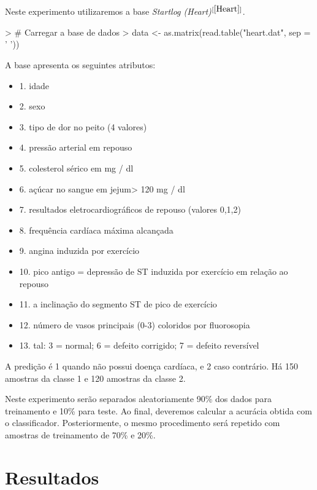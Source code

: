 \documentclass[12pt]{article}
\begin{document}
  \par Neste experimento utilizaremos a base \textit{Startlog (Heart)}$^{[\ref{Heart}]}$.
 
\begin{Schunk}
\begin{Sinput}
> # Carregar a base de dados
> data <- as.matrix(read.table("heart.dat", sep = ' '))
\end{Sinput}
\end{Schunk}
  \par A base apresenta os seguintes atributos:
  
  \begin{itemize}
       \item  1. idade
       \item  2. sexo
       \item  3. tipo de dor no peito (4 valores)
       \item  4. pressão arterial em repouso
       \item  5. colesterol sérico em mg / dl
       \item  6. açúcar no sangue em jejum> 120 mg / dl
       \item  7. resultados eletrocardiográficos de repouso (valores 0,1,2)
       \item  8. frequência cardíaca máxima alcançada
       \item  9. angina induzida por exercício
       \item  10. pico antigo = depressão de ST induzida por exercício em relação ao repouso
       \item  11. a inclinação do segmento ST de pico de exercício
       \item  12. número de vasos principais (0-3) coloridos por fluorosopia
       \item  13. tal: 3 = normal; 6 = defeito corrigido; 7 = defeito reversível
  \end{itemize}
  
  \par A predição é 1 quando não possui doença  cardíaca, e 2 caso contrário. Há 150 amostras da classe 1 e 120 amostras da classe 2. 
  
  \par Neste experimento serão separados aleatoriamente 90\% dos dados para treinamento e 10\% para teste. Ao final, deveremos calcular a acurácia obtida com o classificador. Posteriormente, o mesmo procedimento será repetido com amostras de treinamento de 70\% e 20\%.


\section{Resultados}
\end{document}

